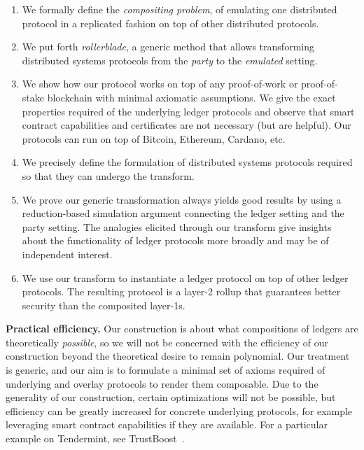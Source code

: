 \begin{enumerate}
  \item We formally define the \emph{compositing problem}, of emulating
        one distributed protocol in a replicated fashion on top of other
        distributed protocols.
  \item We put forth \emph{rollerblade}, a generic method that allows transforming
        distributed systems protocols from the \emph{party} to the \emph{emulated}
        setting.
  \item We show how our protocol works on top of any proof-of-work or proof-of-stake
        blockchain with minimal axiomatic assumptions. We give the exact properties
        required of the underlying ledger protocols and observe that smart contract
        capabilities and certificates are not necessary (but are helpful). Our
        protocols can run on top of Bitcoin, Ethereum, Cardano, etc.
  \item We precisely define the formulation of distributed systems protocols
        required so that they can undergo the \rollerblade transform.
  \item We prove our generic transformation always yields good results by
        using a reduction-based simulation argument connecting the
        ledger setting and the party setting. The analogies elicited through
        our transform give insights about the functionality of ledger protocols
        more broadly and may be of independent interest.
\iflong
  \item We use our transform to instantiate a ledger protocol on top of
        other ledger protocols. The resulting protocol is a layer-2 rollup that
        guarantees better security than the composited layer-1s.
\fi
\end{enumerate}

\noindent
\textbf{Practical efficiency.}
Our construction is about what compositions of ledgers are theoretically \emph{possible},
so we will not be concerned with the efficiency of our construction beyond the
theoretical desire to remain polynomial. Our treatment
is generic, and our aim is to formulate a minimal set of axioms
required of underlying and overlay protocols to render them composable.
Due to the generality of our construction, certain optimizations will not be
possible, but efficiency can be greatly increased for concrete underlying
protocols, for example leveraging smart contract capabilities if they are
available. For a particular example on Tendermint, see TrustBoost~\cite{trustboost}.

